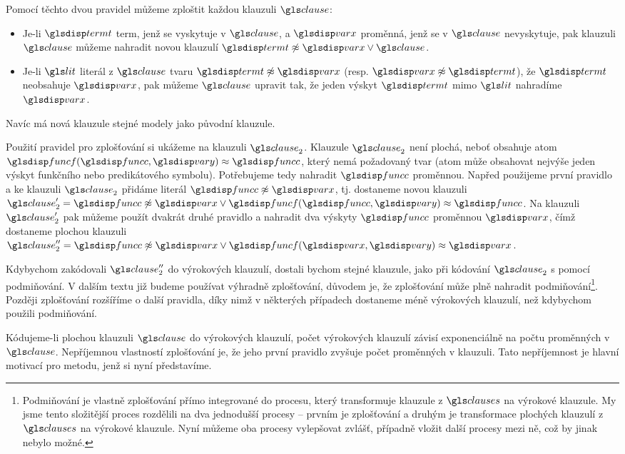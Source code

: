 Pomocí těchto dvou pravidel můžeme zploštit každou
klauzuli $\clause$:
\begin{itemize}
\item Je-li $\term$ term, jenž se vyskytuje v $\clause$, a $\var$ proměnná,
  jenž se v $\clause$ nevyskytuje, pak klauzuli $\clause$ můžeme
  nahradit novou klauzulí $\term \not\approx \var \vee \clause$.
\item Je-li $\lit$ literál z $\clause$ tvaru $\term \not\approx \var$
  (resp. $\var \not\approx \term$),
  že $\term$ neobsahuje $\var$,
  pak můžeme $\clause$ upravit tak, že jeden výskyt $\term$
  mimo $\lit$ nahradíme $\var$.
\end{itemize}
Navíc má nová klauzule stejné modely jako původní klauzule.

Použití pravidel pro zplošťování si ukážeme na klauzuli $\clause_2$.
Klauzule $\clause_2$ není plochá, neboť obsahuje atom
$\func(\funcC, \varY) \approx \funcC$, který nemá požadovaný tvar
(atom může obsahovat nejvýše jeden výskyt funkčního nebo predikátového
symbolu). Potřebujeme tedy nahradit $\funcC$ proměnnou.
Napřed použijeme první pravidlo a ke klauzuli $\clause_2$ přidáme literál
$\funcC \not\approx \var$, tj. dostaneme novou klauzuli
$\clause_2' = \funcC \not\approx \var \vee
  \func(\funcC, \varY) \approx \funcC$.
Na klauzuli $\clause_2'$ pak můžeme použít dvakrát druhé pravidlo
a nahradit dva výskyty $\funcC$ proměnnou $\var$, čímž
dostaneme plochou klauzuli
$\clause_2'' = \funcC \not\approx \var \vee
\func(\var, \varY) \approx \var$.

Kdybychom zakódovali
$\clause_2''$ do výrokových klauzulí, dostali bychom stejné klauzule,
jako při kódování $\clause_2$ s pomocí podmiňování.
V dalším textu již budeme používat výhradně zplošťování,
důvodem je, že zplošťování může plně nahradit
podmiňování\footnote{Podmiňování je vlastně zplošťování
přímo integrované do procesu, který transformuje klauzule z $\clauses$
na výrokové klauzule. My jsme tento složitější proces rozdělili na dva
jednodušší procesy -- prvním je zplošťování a druhým je transformace
plochých klauzulí z $\clauses$ na výrokové klauzule. Nyní
můžeme oba procesy vylepšovat zvlášť, případně vložit další procesy mezi
ně, což by jinak nebylo možné.}.
Později zplošťování rozšíříme o další pravidla,
díky nimž v některých případech dostaneme méně výrokových klauzulí,
než kdybychom použili podmiňování.

Kódujeme-li plochou klauzuli $\clause$ do výrokových klauzulí,
počet výrokových klauzulí závisí exponenciálně na počtu proměnných
v $\clause$.
Nepříjemnou vlastností zplošťování je, že jeho první pravidlo
zvyšuje počet proměnných v klauzuli. Tato nepříjemnost je hlavní motivací
pro metodu, jenž si nyní představíme.

